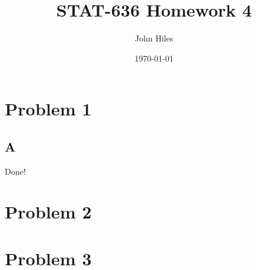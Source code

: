 \documentclass{article}
\title{STAT-636 Homework 4}
\author{John Hiles}
\date\today
\begin{document}
\maketitle %

\section*{Problem 1}
\subsection*{A}
Done!
\section*{Problem 2}

\clearpage

\section*{Problem 3}
\end{document}
